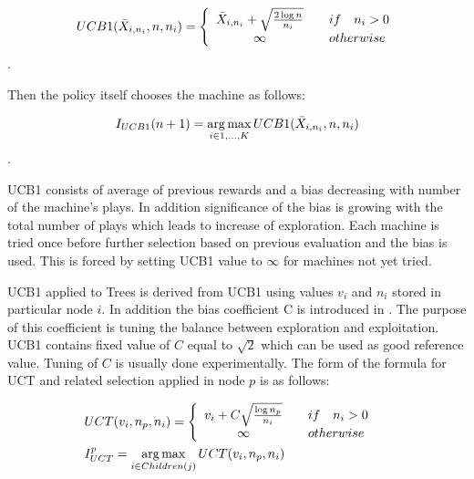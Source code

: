 \begin{equation}
UCB1(\bar{X}_{i,n_i},n,n_i) = 
    \left\{
        \begin{array}{c@{\quad\quad}l}
            \bar{X}_{i,n_i} + \sqrt{{2 \log{n}} \over n_i} & if \quad n_i > 0 \\
            \infty & otherwise \\
        \end{array}
    \right.
\end{equation}.


Then the policy itself chooses the machine as follows:

\begin{equation}
 I_{UCB1}(n+1) = \operatorname*{arg\,max}\limits_{i\in{1,\ldots,K}} UCB1(\bar{X}_{i,n_i},n,n_i)
 \end{equation}.

UCB1 consists of average of previous rewards and a bias decreasing with number of the
machine's plays. In addition significance of the bias is growing with the total number of plays
which 
leads to increase of exploration. Each machine is tried once before further selection based on
previous evaluation and the bias is used. This is forced by setting UCB1 value to $\infty$ for
machines not yet tried.

UCB1 applied to Trees \cite{Kocsis2006} is derived from UCB1 using values $v_i$ and $n_i$ stored in
particular node $i$. In addition the bias coefficient C is introduced in \cite{Chaslot2008}.
The purpose of this coefficient is tuning the balance between exploration and exploitation.
UCB1 contains fixed value of $C$ equal to $\sqrt{2}$ which can be used as good reference value.
Tuning of $C$ is usually done 
experimentally. The form of the formula for UCT and related selection applied in node $p$ is as
follows:

\begin{align}
    &\begin{aligned}
UCT(v_i,n_p,n_i) &= \left\{
        \begin{array}{c@{\quad\quad}l}
            v_i + C \sqrt{{\log{n_p}} \over n_i} & if \quad n_i > 0 \\
            \infty & otherwise \\
        \end{array}
    \right.
    \end{aligned}\\
    &\begin{aligned}
I_{UCT}^p &= \argmax\limits_{i \in Children(j)} UCT(v_i, n_p, n_i)
    \end{aligned}
\end{align}



